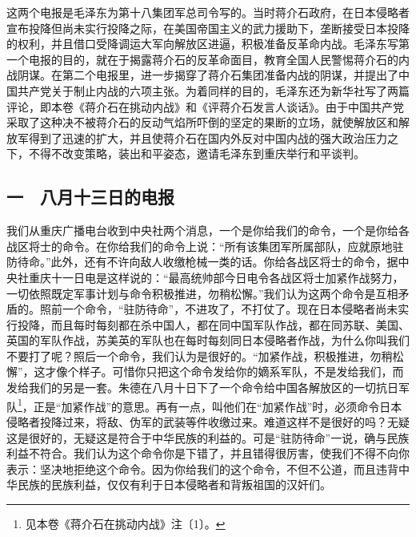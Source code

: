 \documentclass[cn,11pt,chinese]{elegantbook}
\def\myformat#1{\hfil\hfil #1}
\begin{document}
\begin{introduction}\item  这两个电报是毛泽东为第十八集团军总司令写的。当时蒋介石政府，在日本侵略者宣布投降但尚未实行投降之际，在美国帝国主义的武力援助下，垄断接受日本投降的权利，并且借口受降调运大军向解放区进逼，积极准备反革命内战。毛泽东写第一个电报的目的，就在于揭露蒋介石的反革命面目，教育全国人民警惕蒋介石的内战阴谋。在第二个电报里，进一步揭穿了蒋介石集团准备内战的阴谋，并提出了中国共产党关于制止内战的六项主张。为着同样的目的，毛泽东还为新华社写了两篇评论，即本卷《蒋介石在挑动内战》和《评蒋介石发言人谈话》。由于中国共产党采取了这种决不被蒋介石的反动气焰所吓倒的坚定的果断的立场，就使解放区和解放军得到了迅速的扩大，并且使蒋介石在国内外反对中国内战的强大政治压力之下，不得不改变策略，装出和平姿态，邀请毛泽东到重庆举行和平谈判。\end{introduction}
\subsection*{\myformat{一　八月十三日的电报}}
我们从重庆广播电台收到中央社两个消息，一个是你给我们的命令，一个是你给各战区将士的命令。在你给我们的命令上说：“所有该集团军所属部队，应就原地驻防待命。”此外，还有不许向敌人收缴枪械一类的话。你给各战区将士的命令，据中央社重庆十一日电是这样说的：“最高统帅部今日电令各战区将士加紧作战努力，一切依照既定军事计划与命令积极推进，勿稍松懈。”我们认为这两个命令是互相矛盾的。照前一个命令，“驻防待命”，不进攻了，不打仗了。现在日本侵略者尚未实行投降，而且每时每刻都在杀中国人，都在同中国军队作战，都在同苏联、美国、英国的军队作战，苏美英的军队也在每时每刻同日本侵略者作战，为什么你叫我们不要打了呢？照后一个命令，我们认为是很好的。“加紧作战，积极推进，勿稍松懈”，这才像个样子。可惜你只把这个命令发给你的嫡系军队，不是发给我们，而发给我们的另是一套。朱德在八月十日下了一个命令给中国各解放区的一切抗日军队\footnote[1]{ 见本卷《蒋介石在挑动内战》注〔1〕。}，正是“加紧作战”的意思。再有一点，叫他们在“加紧作战”时，必须命令日本侵略者投降过来，将敌、伪军的武装等件收缴过来。难道这样不是很好的吗？无疑这是很好的，无疑这是符合于中华民族的利益的。可是“驻防待命”一说，确与民族利益不符合。我们认为这个命令你是下错了，并且错得很厉害，使我们不得不向你表示：坚决地拒绝这个命令。因为你给我们的这个命令，不但不公道，而且违背中华民族的民族利益，仅仅有利于日本侵略者和背叛祖国的汉奸们。\\
\end{document}
